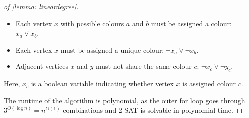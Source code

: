 \begin{proof}[of \cref{lemma: lineardegree}]
\begin{itemize}
    \item Each vertex $x$ with possible colours $a$ and $b$ must be assigned a colour: $x_a \lor x_b$.
    \item Each vertex $x$ must be assigned a unique colour: $\neg x_a \lor \neg x_b$.
    \item Adjacent vertices $x$ and $y$ must not share the same colour $c$: $\neg x_c \lor \neg y_c$.
\end{itemize}

Here, $x_c$ is a boolean variable indicating whether vertex $x$ is assigned colour $c$.

The runtime of the algorithm is polynomial, as the outer for loop goes through $3^{O(\log{n})}=n^{O(1)}$ combinations and 2-SAT is solvable in polynomial time.

\end{proof}

